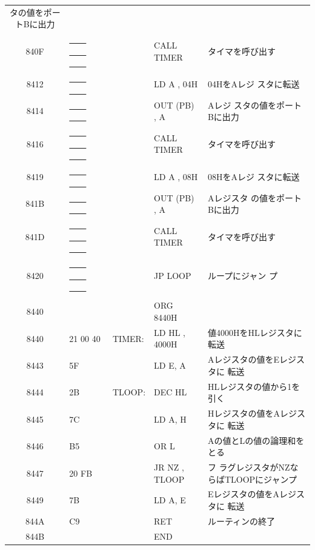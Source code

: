 \begin{description}
\begin{table}
\begin{center}
\begin{tabular}{|c|l|ll|l|}
                タの値をポートBに出力\\
   840F &  \underline{~~~~} \underline{~~~~} \underline{~~~~}  &   &   CALL
                TIMER&タイマを呼び出す\\
   8412 &  \underline{~~~~} \underline{~~~~}     &   &   LD A , 04H& 04HをAレジ
                    スタに転送\\
   8414 &  \underline{~~~~} \underline{~~~~}      &   &   OUT (PB) , A   & Aレジ
                    スタの値をポートBに出力\\
   8416 &  \underline{~~~~} \underline{~~~~} \underline{~~~~}   &   &   CALL
                TIMER& タイマを呼び出す\\
   8419 &  \underline{~~~~} \underline{~~~~}      &   &   LD A , 08H& 08HをAレジ
                    スタに転送\\
   841B &  \underline{~~~~} \underline{~~~~}     &   &   OUT (PB) , A& Aレジスタ
                    の値をポートBに出力\\
   841D &  \underline{~~~~} \underline{~~~~} \underline{~~~~}   &   &   CALL
                TIMER& タイマを呼び出す\\
   8420 &  \underline{~~~~} \underline{~~~~} \underline{~~~~}   &   &   JP LOOP& ループにジャン
                    プ\\
        &            &   &&\\
   8440 &            &    &    ORG 8440H&\\
   8440 &  21 00 40   &    TIMER:& LD
                HL , 4000H& 値4000HをHLレジスタに転送\\
   8443 &  5F        &    &    LD E, A&Aレジスタの値をEレジスタに
                    転送\\
   8444 &  2B        &    TLOOP:& DEC HL&HLレジスタの値から1を引く\\
   8445 &  7C        &    &    LD A, H&Hレジスタの値をAレジスタに
                    転送\\
   8446 &  B5        &    &    OR L& Aの値とLの値の論理和をとる\\
   8447 &  20 FB       &    &    JR NZ , TLOOP& フ
                    ラグレジスタがNZならばTLOOPにジャンプ\\
   8449 &  7B        &    &    LD A, E& Eレジスタの値をAレジスタに
                    転送\\
   844A &  C9        &    &    RET&ルーティンの終了\\
   844B &            &    &    END&\\


\end{tabular}
\end{center}
\end{table}
\end{description}
